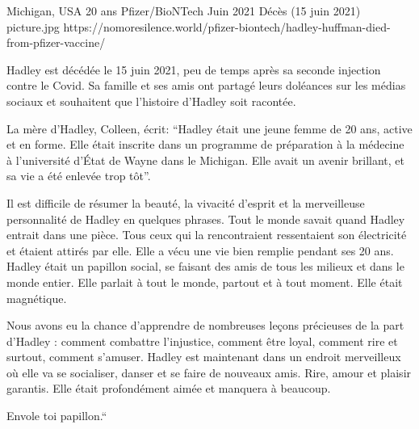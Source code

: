 {Michigan, USA}
{20 ans}
{Pfizer/BioNTech}
{Juin 2021}
{Décès (15 juin 2021)}
{picture.jpg}
{https://nomoresilence.world/pfizer-biontech/hadley-huffman-died-from-pfizer-vaccine/}
{

Hadley est décédée le 15 juin 2021, peu de temps après sa seconde injection
contre le Covid. Sa famille et ses amis ont partagé leurs doléances sur les
médias sociaux et souhaitent que l'histoire d'Hadley soit racontée.

La mère d'Hadley, Colleen, écrit: “Hadley était une jeune femme de 20 ans, active
et en forme. Elle était inscrite dans un programme de préparation à la médecine
à l'université d'État de Wayne dans le Michigan. Elle avait un avenir brillant,
et sa vie a été enlevée trop tôt”.

Il est difficile de résumer la beauté, la vivacité d'esprit et la merveilleuse
personnalité de Hadley en quelques phrases. Tout le monde savait quand Hadley
entrait dans une pièce. Tous ceux qui la rencontraient ressentaient son
électricité et étaient attirés par elle. Elle a vécu une vie bien remplie
pendant ses 20 ans. Hadley était un papillon social, se faisant des amis de tous
les milieux et dans le monde entier. Elle parlait à tout le monde, partout et à
tout moment. Elle était magnétique.

Nous avons eu la chance d'apprendre de nombreuses leçons précieuses de la part
d'Hadley : comment combattre l'injustice, comment être loyal, comment rire et
surtout, comment s'amuser. Hadley est maintenant dans un endroit merveilleux où
elle va se socialiser, danser et se faire de nouveaux amis. Rire, amour et
plaisir garantis. Elle était profondément aimée et manquera à beaucoup.

Envole toi papillon.“

}
